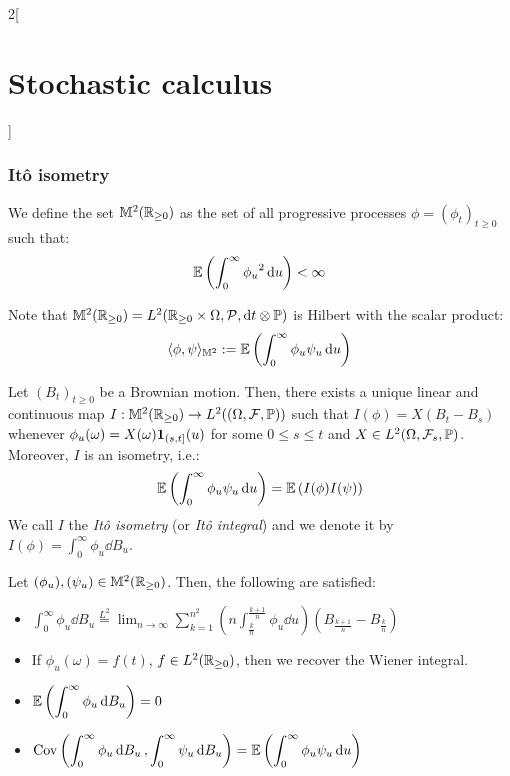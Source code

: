 \documentclass[../../../main_math.tex]{subfiles}
\begin{document}
\begin{multicols}{2}[\section{Stochastic calculus}]
  \subsubsection{Itô isometry}
  \begin{definition}
    We define the set $\mathbb{M}^2(\mathbb{R}_{\geq 0})$ as the set of all progressive processes $\phi={(\phi_t)}_{t\geq 0}$ such that:
    $$
      \mathbb{E}\left(\int_0^\infty{\phi_u}^2\dd{u}\right)<\infty
    $$
  \end{definition}
  \begin{remark}
    Note that $\mathbb{M}^2(\mathbb{R}_{\geq 0})=L^2(\mathbb{R}_{\geq 0}\times\Omega,\mathcal{P},\dd{t}\otimes\mathbb{P})$ is Hilbert with the scalar product:
    $$
      \langle \phi,\psi\rangle_{\mathbb{M}^2}:=\mathbb{E}\left(\int_0^\infty\phi_u\psi_u\dd{u}\right)
    $$
  \end{remark}
  \begin{theorem}
    Let ${(B_t)}_{t\geq 0}$ be a Brownian motion. Then, there exists a unique linear and continuous map $I:\mathbb{M}^2(\mathbb{R}_{\geq 0})\to L^2((\Omega,\mathcal{F},\mathbb{P}))$ such that $I(\phi)=X(B_t-B_s)$ whenever $\phi_u(\omega)=X(\omega)\boldsymbol{\mathrm{1}}_{(s,t]}(u)$ for some $0\leq s\leq t$ and $X\in L^2(\Omega,\mathcal{F}_s,\mathbb{P})$. Moreover, $I$ is an isometry, i.e.:
    $$
      \mathbb{E}\left(\int_0^\infty{\phi_u}{\psi_u} \dd{u}\right)=\mathbb{E}\left(I(\phi)I(\psi)\right)
    $$
    We call $I$ the \emph{Itô isometry} (or \emph{Itô integral}) and we denote it by $I(\phi)=\int_0^\infty\phi_u\dd{B_u}$.
  \end{theorem}
  \begin{proposition}
    Let ${(\phi_u)}, {(\psi_u)}\in \mathbb{M}^2(\mathbb{R}_{\geq 0})$. Then, the following are satisfied:
    \begin{itemize}
      \item $\displaystyle
              \int_0^\infty \phi_u\dd{B_u}\overset{L^2}{=}\lim_{n\to\infty}\sum_{k=1}^{n^2}\left(n\int_{\frac{k}{n}}^{\frac{k+1}{n}}\phi_u\dd{u}\right)(B_{\frac{k+1}{n}}-B_{\frac{k}{n}})
            $
      \item If $\phi_u(\omega)=f(t)$, $f\in L^2(\mathbb{R}_{\geq 0})$, then we recover the Wiener integral.
      \item $\displaystyle
              \mathbb{E}\left(\int_0^\infty \phi_u\dd{B_u}\right)=0$
      \item $\displaystyle\mathrm{Cov}\left(\int_0^\infty \phi_u\dd{B_u},\int_0^\infty \psi_u\dd{B_u}\right)=\mathbb{E}\left(\int_0^\infty \phi_u\psi_u\dd{u}\right)$
    \end{itemize}
  \end{proposition}

\end{multicols}
\end{document}
